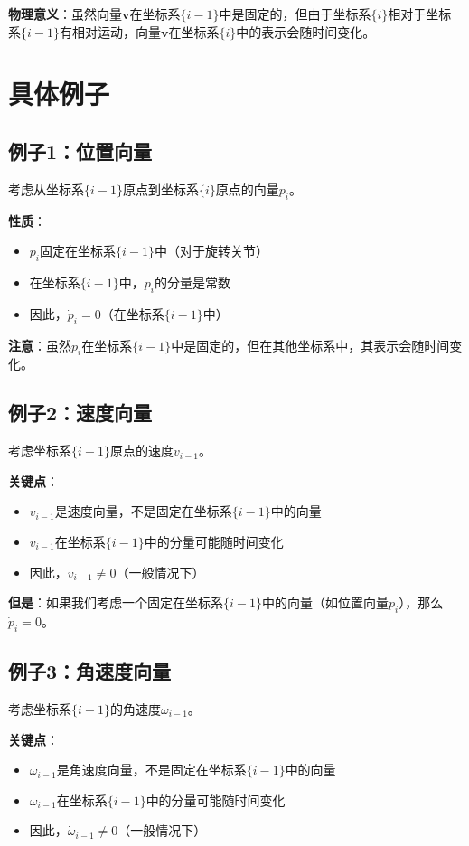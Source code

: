 \documentclass[12pt,a4paper]{article}
\begin{document}
\textbf{物理意义}：虽然向量$\mathbf{v}$在坐标系$\{i-1\}$中是固定的，但由于坐标系$\{i\}$相对于坐标系$\{i-1\}$有相对运动，向量$\mathbf{v}$在坐标系$\{i\}$中的表示会随时间变化。

\section{具体例子}

\subsection{例子1：位置向量}

考虑从坐标系$\{i-1\}$原点到坐标系$\{i\}$原点的向量$p_i$。

\textbf{性质}：
\begin{itemize}
\item $p_i$固定在坐标系$\{i-1\}$中（对于旋转关节）
\item 在坐标系$\{i-1\}$中，$p_i$的分量是常数
\item 因此，$\dot{p}_i = 0$（在坐标系$\{i-1\}$中）
\end{itemize}

\textbf{注意}：虽然$p_i$在坐标系$\{i-1\}$中是固定的，但在其他坐标系中，其表示会随时间变化。

\subsection{例子2：速度向量}

考虑坐标系$\{i-1\}$原点的速度$v_{i-1}$。

\textbf{关键点}：
\begin{itemize}
\item $v_{i-1}$是速度向量，不是固定在坐标系$\{i-1\}$中的向量
\item $v_{i-1}$在坐标系$\{i-1\}$中的分量可能随时间变化
\item 因此，$\dot{v}_{i-1} \neq 0$（一般情况下）
\end{itemize}

\textbf{但是}：如果我们考虑一个固定在坐标系$\{i-1\}$中的向量（如位置向量$p_i$），那么$\dot{p}_i = 0$。

\subsection{例子3：角速度向量}

考虑坐标系$\{i-1\}$的角速度$\omega_{i-1}$。

\textbf{关键点}：
\begin{itemize}
\item $\omega_{i-1}$是角速度向量，不是固定在坐标系$\{i-1\}$中的向量
\item $\omega_{i-1}$在坐标系$\{i-1\}$中的分量可能随时间变化
\item 因此，$\dot{\omega}_{i-1} \neq 0$（一般情况下）
\end{itemize}
\end{document}

